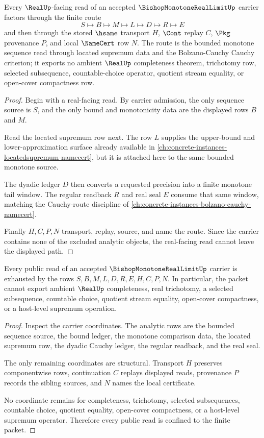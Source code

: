 \begin{theorem}
\label{thm:bishop-monotone-real-limit-cauchy-route}
Every $\RealUp$-facing read of an accepted $\BishopMonotoneRealLimitUp$ carrier factors through the finite route
$$
S \longmapsto B \longmapsto M \longmapsto L \longmapsto D \longmapsto R \longmapsto E
$$
and then through the stored $\hsame$ transport $H$, $\Cont$ replay $C$, $\Pkg$ provenance $P$, and local $\NameCert$ row $N$. The route is the bounded monotone sequence read through located supremum data and the Bolzano-Cauchy Cauchy criterion; it exports no ambient $\RealUp$ completeness theorem, trichotomy row, selected subsequence, countable-choice operator, quotient stream equality, or open-cover compactness row.
\end{theorem}
\begin{proof}
Begin with a real-facing read. By carrier admission, the only sequence source is $S$, and the only bound and monotonicity data are the displayed rows $B$ and $M$.

Read the located supremum row next. The row $L$ supplies the upper-bound and lower-approximation surface already available in \autoref{ch:concrete-instances-locatedsupremum-namecert}, but it is attached here to the same bounded monotone source.

The dyadic ledger $D$ then converts a requested precision into a finite monotone tail window. The regular readback $R$ and real seal $E$ consume that same window, matching the Cauchy-route discipline of \autoref{ch:concrete-instances-bolzano-cauchy-namecert}.

Finally $H,C,P,N$ transport, replay, source, and name the route. Since the carrier contains none of the excluded analytic objects, the real-facing read cannot leave the displayed path.
\end{proof}

\begin{theorem}
\label{thm:bishop-monotone-real-limit-nonescape}
Every public read of an accepted $\BishopMonotoneRealLimitUp$ carrier is exhausted by the rows $S,B,M,L,D,R,E,H,C,P,N$. In particular, the packet cannot export ambient $\RealUp$ completeness, real trichotomy, a selected subsequence, countable choice, quotient stream equality, open-cover compactness, or a host-level supremum operation.
\end{theorem}
\begin{proof}
Inspect the carrier coordinates. The analytic rows are the bounded sequence source, the bound ledger, the monotone comparison data, the located supremum row, the dyadic Cauchy ledger, the regular readback, and the real seal.

The only remaining coordinates are structural. Transport $H$ preserves componentwise rows, continuation $C$ replays displayed reads, provenance $P$ records the sibling sources, and $N$ names the local certificate.

No coordinate remains for completeness, trichotomy, selected subsequences, countable choice, quotient equality, open-cover compactness, or a host-level supremum operator. Therefore every public read is confined to the finite packet.
\end{proof}

